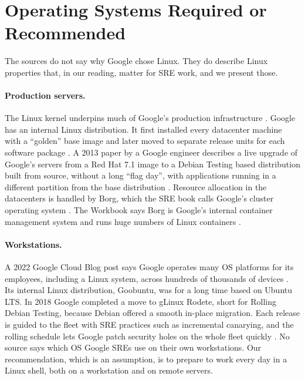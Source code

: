 \section{Operating Systems Required or Recommended}\label{sec:os}

The sources do not say why Google chose Linux. They do describe Linux properties that, in our reading, matter for SRE work, and we present those.

\paragraph{Production servers.}
The Linux kernel underpins much of Google's production infrastructure \cite{bsrs}. Google has an internal Linux distribution. It first installed every datacenter machine with a ``golden'' base image and later moved to separate release units for each software package \cite{bsrs}. A 2013 paper by a Google engineer describes a live upgrade of Google's servers from a Red Hat 7.1 image to a Debian Testing based distribution built from source, without a long ``flag day'', with applications running in a different partition from the base distribution \cite{usenix-conference-lisa13-technical-sessions-presentation-merlin}. Resource allocation in the datacenters is handled by Borg, which the SRE book calls Google's cluster operating system \cite{sre-book}. The Workbook says Borg is Google's internal container management system and runs huge numbers of Linux containers \cite{workbook}.

\paragraph{Workstations.}
A 2022 Google Cloud Blog post says Google operates many OS platforms for its employees, including a Linux system, across hundreds of thousands of devices \cite{google-cloud-blog}. Its internal Linux distribution, Goobuntu, was for a long time based on Ubuntu LTS. In 2018 Google completed a move to gLinux Rodete, short for Rolling Debian Testing, because Debian offered a smooth in-place migration. Each release is guided to the fleet with SRE practices such as incremental canarying, and the rolling schedule lets Google patch security holes on the whole fleet quickly \cite{google-cloud-blog}. No source says which OS Google SREs use on their own workstations. Our recommendation, which is an assumption, is to prepare to work every day in a Linux shell, both on a workstation and on remote servers.

